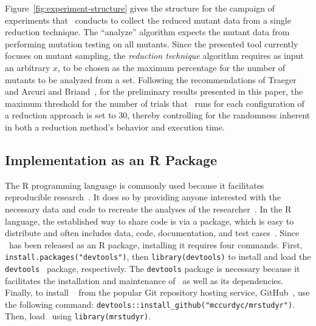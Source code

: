 Figure~\ref{fig:experiment-structure} gives the structure for the campaign of experiments that \mr~conducts to collect
the reduced mutant data from a single reduction technique. The ``analyze'' algorithm expects the mutant data from
performing mutation testing on all mutants. Since the presented tool currently focuses on mutant sampling, the
\textit{reduction technique} algorithm requires as input an arbitrary $x$, to be chosen as the maximum percentage for
the number of mutants to be analyzed from a set. Following the recommendations of Traeger~\etal~\cite{traeger2008nine}
and Arcuri and Briand~\cite{arcuri2014hitchhiker}, for the preliminary results presented in this paper, the maximum
threshold for the number of trials that \mr~runs for each configuration of a reduction approach is set to 30, thereby
controlling for the randomness inherent in both a reduction method's behavior and execution time.

\subsection{Implementation as an R Package}


The R programming language is commonly used because it facilitates reproducible research~\cite{Kapfhammer2011,
Kapfhammer2016}. It does so by providing anyone interested with the necessary data and code to recreate the analyses of
the researcher~\cite{gentleman2012statistical}. In the R language, the established way to share code is via a package,
which is easy to distribute and often includes data, code, documentation, and test cases~\cite{Kapfhammer2016,
wickham2015r}. Since \mr~has been released as an R package, installing it requires four commands. First,
\texttt{install.packages("devtools")}, then {\texttt{library(devtools)}} to install and load the
{\texttt{devtools}}~\cite{devtools} package, respectively. The \texttt{devtools} package is necessary because it
facilitates the installation and maintenance of \mr~as well as its dependencies. Finally, to install \mr~\cite{tool}
from the popular Git repository hosting service, GitHub~\cite{github}, use the following command:
{\small \texttt{devtools::install\_github("mccurdyc/mrstudyr")}}. Then, load \mr~using \texttt{library(mrstudyr)}.


